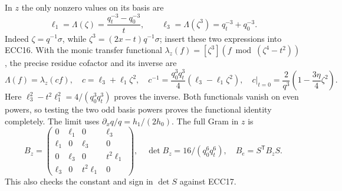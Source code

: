 \documentclass[11pt]{article}
\begin{document}
In $z$ the only nonzero values on its basis are
\begin{equation}
 \ell_1=\Lambda(\zeta)=\frac{q_t^{-3}-q_0^{-3}}t,\qquad
 \ell_3=\Lambda(\zeta^3)=q_t^{-3}+q_0^{-3}.
 \tag{ECC18}
\end{equation}
Indeed $\zeta=q^{-1}\sigma$, while $\zeta^3=(2x-t)q^{-1}\sigma$;
insert these two expressions into ECC16. With the monic transfer
functional $\lambda_z(f)=[\zeta^3](f\bmod(\zeta^4-t^2))$, the precise
residue cofactor and its inverse are
\begin{equation}
 \Lambda(f)=\lambda_z(cf),\quad
 c=\ell_3+\ell_1\zeta^2,\quad
 c^{-1}=\frac{q_0^3q_t^3}{4}(\ell_3-\ell_1\zeta^2),\quad
 c|_{t=0}=\frac2{q^3}\left(1-\frac{3\eta}{4}\zeta^2\right).
 \tag{ECC19}
\end{equation}
Here $\ell_3^2-t^2\ell_1^2=4/(q_0^3q_t^3)$ proves the inverse. Both
functionals vanish on even powers, so testing the two odd basis powers
proves the functional identity completely. The limit uses
$\partial_x q/q=h_1/(2h_0)$. The full Gram in $z$ is
\begin{equation}
 B_z=\begin{pmatrix}0&\ell_1&0&\ell_3\\
 \ell_1&0&\ell_3&0\\0&\ell_3&0&t^2\ell_1\\
 \ell_3&0&t^2\ell_1&0\end{pmatrix},\quad
 \det B_z=16/(q_0^6q_t^6),\quad B_e=S^{\mathsf T}B_zS.
 \tag{ECC20}
\end{equation}
This also checks the constant and sign in $\det S$ against ECC17.
\end{document}
